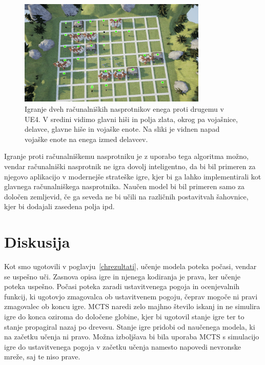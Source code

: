 \documentclass[a4paper, 12pt]{book}
\begin{document}
{\begin{figure}[h!]
	\begin{center}
		\includegraphics[width=0.8\textwidth]{photos/ue4attack.pdf}
	\end{center}
	\caption{Igranje dveh računalniških nasprotnikov enega proti drugemu v UE4. 
		V sredini vidimo glavni hiši in polja zlata, okrog pa vojašnice, delavce, glavne hiše in vojaške enote.
		Na sliki je vidnen napad vojaške enote na enega izmed delavcev. }
	\label{visualization_ue4}
\end{figure}

Igranje proti računalniškemu nasprotniku je z uporabo tega algoritma možno, vendar računalniški nasprotnik ne igra dovolj inteligentno, da bi bil primeren za njegovo aplikacijo v modernejše strateške igre, kjer bi ga lahko implementirali kot glavnega računalniškega nasprotnika.
Naučen model bi bil primeren samo za določen zemljevid, če ga seveda ne bi učili na različnih postavitvah šahovnice, kjer bi dodajali zasedena polja ipd.


\chapter{Diskusija}
\label{chdiskusija}

Kot smo ugotovili v poglavju~\ref{chrezultati}, učenje modela poteka počasi, vendar se uspešno uči.
Zasnova opisa igre in njenega kodiranja je prava, ker učenje poteka uspešno.
Počasi poteka zaradi ustavitvenega pogoja in ocenjevalnih funkcij, ki ugotovjo zmagovalca ob ustavitvenem pogoju, čeprav mogoče ni pravi zmagovalec ob koncu igre.
MCTS naredi zelo majhno število iskanj in ne simulira igre do konca oziroma do določene globine, kjer bi ugotovil stanje igre ter to stanje propagiral nazaj po drevesu.
Stanje igre pridobi od naučenega modela, ki na začetku učenja ni pravo.
Možna izboljšava bi bila uporaba MCTS s simulacijo igre do ustavitvenega pogoja v začetku učenja namesto napovedi nevronske mreže, saj te niso prave.

}
\end{document}
